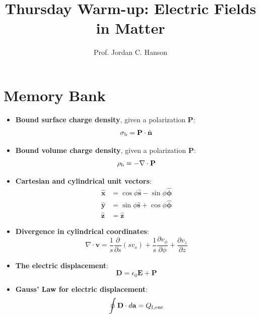 \documentclass[10pt]{article}
\begin{document}
\twocolumn

\title{Thursday Warm-up: Electric Fields in Matter}
\author{Prof. Jordan C. Hanson}

\maketitle

\section{Memory Bank}

\small

\begin{itemize}
\item \textbf{Bound surface charge density}, given a polarization $\mathbf{P}$:
\begin{equation}
\sigma_{\rm b} = \mathbf{P} \cdot \hat{\mathbf{n}}
\end{equation}
\item \textbf{Bound volume charge density}, given a polarization $\mathbf{P}$:
\begin{equation}
\rho_{\rm b} = -\nabla \cdot \mathbf{P}
\end{equation}
\item \textbf{Cartesian and cylindrical unit vectors}:
\begin{align}
\hat{\mathbf{x}} &= \cos\phi \hat{\mathbf{s}} - \sin\phi \hat{\boldsymbol{\phi}} \\
\hat{\mathbf{y}} &= \sin\phi \hat{\mathbf{s}} + \cos\phi \hat{\boldsymbol{\phi}} \\
\hat{\mathbf{z}} &= \hat{\mathbf{z}}
\end{align}
\item \textbf{Divergence in cylindrical coordinates}:
\begin{equation}
\nabla \cdot \mathbf{v} = \frac{1}{s}\frac{\partial}{\partial s}(s v_s) + \frac{1}{s}\frac{\partial v_\phi}{\partial \phi} + \frac{\partial v_z}{\partial z}
\end{equation}
\item \textbf{The electric displacement}:
\begin{equation}
\mathbf{D} = \epsilon_0 \mathbf{E} + \mathbf{P}
\end{equation}
\item \textbf{Gauss' Law for electric displacement}:
\begin{equation}
\oint \mathbf{D} \cdot d\mathbf{a} = Q_{\rm f,enc}
\end{equation}
\end{itemize}
\end{document}

